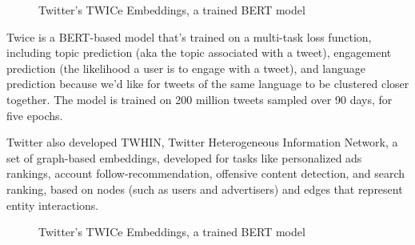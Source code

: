 \documentclass[11pt, table]{diazessay} %
\begin{document}
\begin{sloppypar}
\begin{figure}[H]
\caption{Twitter's TWICe Embeddings, a trained BERT model\citep{liu2022twice}}
\end{figure}

Twice is a BERT-based model that's trained on a multi-task loss function, including topic prediction (aka the topic associated with a tweet), engagement prediction (the likelihood a user is to engage with a tweet), and language prediction because we'd like for tweets of the same language to be clustered closer together. The model is trained on 200 million tweets sampled over 90 days, for five epochs.

Twitter also developed TWHIN\citep{el2022twhin}, Twitter Heterogeneous Information Network, a set of graph-based embeddings\citep{el2022twhin}, developed for tasks like personalized ads rankings, account follow-recommendation, offensive content detection, and search ranking, based on nodes (such as users and advertisers) and edges that represent entity interactions. 

\begin{figure}[H]
\caption{Twitter's TWICe Embeddings, a trained BERT model\citep{el2022twhin}}
\end{figure}


\end{sloppypar}
\end{document}
